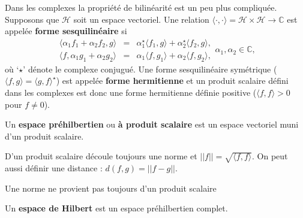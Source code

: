\begin{remark}
    Dans les complexes la propriété de bilinéarité est un peu plus compliquée. Supposons que $\mathcal{H}$ soit un espace vectoriel. Une relation $\langle\cdot,\cdot\rangle = \mathcal{H}\times\mathcal{H} \rightarrow\mathbb{C}$ est appelée \textbf{forme sesquilinéaire} si
    \begin{equation*}
        \begin{array}{rcl}
            \langle \alpha_1f_1 + \alpha_2f_2,g \rangle & = & \alpha_1^\star\langle f_1,g \rangle + \alpha_2^\star \langle f_2,g \rangle, \\
            \langle f,\alpha_1g_1 + \alpha_2g_2 \rangle & = & \alpha_1\langle f,g_1 \rangle + \alpha_2 \langle f,g_2 \rangle,
        \end{array}
        \alpha_1,\alpha_2\in\mathbb{C},
    \end{equation*}
    où `$\star$' dénote le complexe conjugué. Une forme sesquilinéaire symétrique ($\langle f,g \rangle = \langle g,f \rangle^\star$) est appelée \textbf{forme hermitienne} et un produit scalaire défini dans les complexes est donc une forme hermitienne définie positive ($\langle f,f \rangle>0$ pour $f\neq0$).
\end{remark}

\begin{definition}
    Un \textbf{espace préhilbertien} ou \textbf{à produit scalaire} est un espace vectoriel muni d'un produit scalaire.
\end{definition}

\begin{remark}
     D'un produit scalaire découle toujours une norme et $||f|| = \sqrt{\langle f,f \rangle}$. On peut aussi définir une distance : $d(f,g) = ||f-g||$.
     
     \danger Une norme ne provient pas toujours d'un produit scalaire
\end{remark}

\begin{definition}
    Un \textbf{espace de Hilbert} est un espace préhilbertien complet.
\end{definition}

